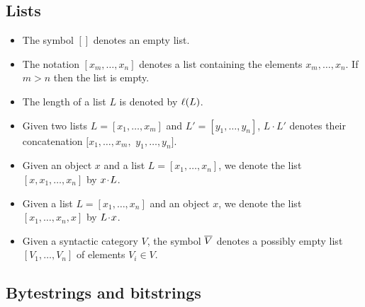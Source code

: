 \subsection{Lists}
\label{sec:notation-lists}
\begin{itemize}
\item  The symbol $[]$ denotes an empty list.%

\item The notation $[x_m, \ldots, x_n]$ denotes a list containing the elements
  $x_m, \ldots, x_n$.  If $m>n$ then the list is empty.%

\item The length of a list $L$ is denoted by $\operatorname{\ell}(L)$.%

\item Given two lists $L = [x_1,\ldots, x_m]$ and $L' = [y_1,\ldots, y_n]$, $L\cdot L'$
  denotes their concatenation  $[x_1,\ldots, x_m,$ $y_1, \ldots, y_n]$.  %

\item Given an object $x$ and a list $L = [x_1,\ldots, x_n]$,
  we denote the list $[x,x_1,\ldots, x_n]$ by $x \mathbin{\!\cdot\!} L$.%

\item Given a list $L = [x_1, \ldots, x_n]$ and an object $x$,
  we denote the list $[x_1, \ldots, x_n, x]$ by $L \mathbin{\!\cdot\!} x$.%


\item Given a syntactic category $V$, the symbol $\overline{V}$ denotes a
  possibly empty list $[V_1,\ldots, V_n]$ of elements $V_i \in V$.%
\end{itemize}

\subsection{Bytestrings and bitstrings}
\label{sec:notation-bytestrings}

